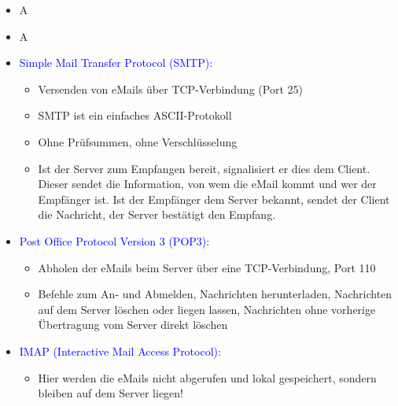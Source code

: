 \begin{itemize}
    \item \todo A
\end{itemize}

\begin{itemize}
    \item \todo A
\end{itemize}

\begin{itemize}
    \item \textcolor{blue}{Simple Mail Transfer Protocol (SMTP):}
    \begin{itemize}
        \item Versenden von eMails über TCP-Verbindung (Port 25)
        \item SMTP ist ein einfaches ASCII-Protokoll
        \item Ohne Prüfsummen, ohne Verschlüsselung
        \item Ist der Server zum Empfangen bereit, signalisiert er dies dem Client.
        Dieser sendet die Information, von wem die eMail kommt und wer der Empfänger ist.
        Ist der Empfänger dem Server bekannt, sendet der Client die Nachricht, der Server bestätigt den Empfang.
    \end{itemize}
    \item \textcolor{blue}{Post Office Protocol Version 3 (POP3):}
    \begin{itemize}
        \item Abholen der eMails beim Server über eine TCP-Verbindung, Port 110
        \item Befehle zum An- und Abmelden, Nachrichten herunterladen, Nachrichten auf dem Server löschen oder liegen lassen, Nachrichten ohne vorherige Übertragung vom Server direkt löschen
    \end{itemize}
    \item \textcolor{blue}{IMAP (Interactive Mail Access Protocol):}
    \begin{itemize}
        \item Hier werden die eMails nicht abgerufen und lokal gespeichert, sondern bleiben auf dem Server liegen!
    \end{itemize}
\end{itemize}

